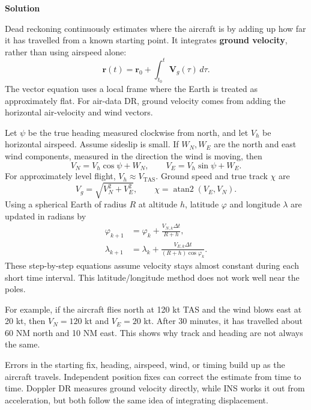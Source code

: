 \documentclass[12pt,a4paper]{article}
\begin{document}
\textbf{Solution}

Dead reckoning continuously estimates where the aircraft is by adding up how far it has travelled from a known starting point. It integrates \textbf{ground velocity}, rather than using airspeed alone:
\[
\boxed{\mathbf r(t)=\mathbf r_0+\int_{t_0}^{t}\mathbf V_g(\tau)\,d\tau.}
\]
The vector equation uses a local frame where the Earth is treated as approximately flat. For air-data DR, ground velocity comes from adding the horizontal air-velocity and wind vectors.

\begin{center}
\end{center}

Let $\psi$ be the true heading measured clockwise from north, and let $V_h$ be horizontal airspeed. Assume sideslip is small. If $W_N,W_E$ are the north and east wind components, measured in the direction the wind is moving, then
\[
V_N=V_h\cos\psi+W_N,\qquad
V_E=V_h\sin\psi+W_E.
\]
For approximately level flight, $V_h\approx V_{\mathrm{TAS}}$. Ground speed and true track $\chi$ are
\[
V_g=\sqrt{V_N^2+V_E^2},\qquad
\chi=\operatorname{atan2}(V_E,V_N).
\]
Using a spherical Earth of radius $R$ at altitude $h$, latitude $\varphi$ and longitude $\lambda$ are updated in radians by
\[
\boxed{\begin{aligned}
\varphi_{k+1}&=\varphi_k+\frac{V_{N,k}\Delta t}{R+h},\\
\lambda_{k+1}&=\lambda_k+\frac{V_{E,k}\Delta t}{(R+h)\cos\varphi_k}.
\end{aligned}}
\]
These step-by-step equations assume velocity stays almost constant during each short time interval. This latitude/longitude method does not work well near the poles.

For example, if the aircraft flies north at 120 kt TAS and the wind blows east at 20 kt, then $V_N=120$ kt and $V_E=20$ kt. After 30 minutes, it has travelled about 60 NM north and 10 NM east. This shows why track and heading are not always the same.

Errors in the starting fix, heading, airspeed, wind, or timing build up as the aircraft travels. Independent position fixes can correct the estimate from time to time. Doppler DR measures ground velocity directly, while INS works it out from acceleration, but both follow the same idea of integrating displacement.
\end{document}
